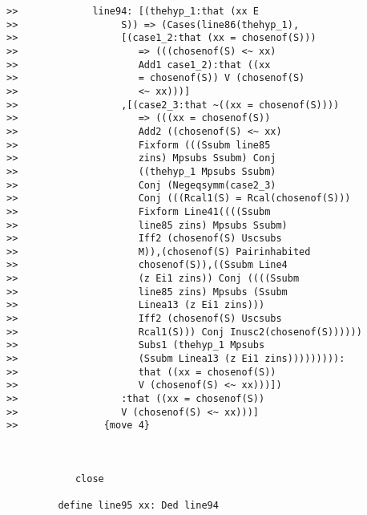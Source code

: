 \documentclass[12pt]{article}
\begin{document}
\begin{verbatim}
>>             line94: [(thehyp_1:that (xx E
>>                  S)) => (Cases(line86(thehyp_1),
>>                  [(case1_2:that (xx = chosenof(S)))
>>                     => (((chosenof(S) <~ xx)
>>                     Add1 case1_2):that ((xx
>>                     = chosenof(S)) V (chosenof(S)
>>                     <~ xx)))]
>>                  ,[(case2_3:that ~((xx = chosenof(S))))
>>                     => (((xx = chosenof(S))
>>                     Add2 ((chosenof(S) <~ xx)
>>                     Fixform (((Ssubm line85
>>                     zins) Mpsubs Ssubm) Conj
>>                     ((thehyp_1 Mpsubs Ssubm)
>>                     Conj (Negeqsymm(case2_3)
>>                     Conj (((Rcal1(S) = Rcal(chosenof(S)))
>>                     Fixform Line41((((Ssubm
>>                     line85 zins) Mpsubs Ssubm)
>>                     Iff2 (chosenof(S) Uscsubs
>>                     M)),(chosenof(S) Pairinhabited
>>                     chosenof(S)),((Ssubm Line4
>>                     (z Ei1 zins)) Conj ((((Ssubm
>>                     line85 zins) Mpsubs (Ssubm
>>                     Linea13 (z Ei1 zins)))
>>                     Iff2 (chosenof(S) Uscsubs
>>                     Rcal1(S))) Conj Inusc2(chosenof(S))))))
>>                     Subs1 (thehyp_1 Mpsubs
>>                     (Ssubm Linea13 (z Ei1 zins))))))))):
>>                     that ((xx = chosenof(S))
>>                     V (chosenof(S) <~ xx)))])
>>                  :that ((xx = chosenof(S))
>>                  V (chosenof(S) <~ xx)))]
>>               {move 4}



            close

         define line95 xx: Ded line94


\end{verbatim}
\end{document}

